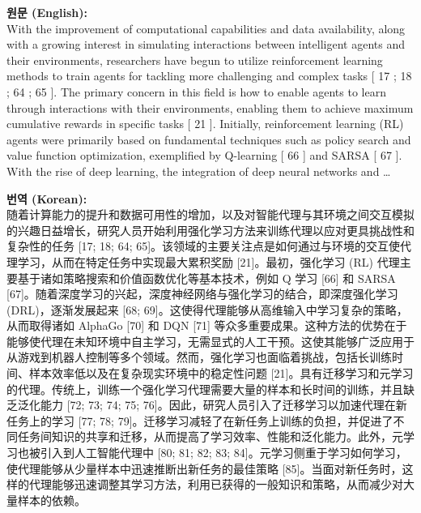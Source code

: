 \documentclass[12pt,a4paper]{article}
\begin{document}
\begin{mdframed}[style=orig]
\noindent\textbf{\small 원문 (English):}\\[2pt]
\small With the improvement of computational capabilities and data availability, along with a growing interest in simulating interactions between intelligent agents and their environments, researchers have begun to utilize reinforcement learning methods to train agents for tackling more challenging and complex tasks [ 17 ; 18 ; 64 ; 65 ]. The primary concern in this field is how to enable agents to learn through interactions with their environments, enabling them to achieve maximum cumulative rewards in specific tasks [ 21 ]. Initially, reinforcement learning (RL) agents were primarily based on fundamental techniques such as policy search and value function optimization, exemplified by Q-learning [ 66 ] and SARSA [ 67 ]. With the rise of deep learning, the integration of deep neural networks and  \ldots
\end{mdframed}
\vspace{0.4em}

\begin{mdframed}[style=ko]
\noindent\textbf{\small 번역 (Korean):}\\[2pt]
随着计算能力的提升和数据可用性的增加，以及对智能代理与其环境之间交互模拟的兴趣日益增长，研究人员开始利用强化学习方法来训练代理以应对更具挑战性和复杂性的任务 [17; 18; 64; 65]。该领域的主要关注点是如何通过与环境的交互使代理学习，从而在特定任务中实现最大累积奖励 [21]。最初，强化学习 (RL) 代理主要基于诸如策略搜索和价值函数优化等基本技术，例如 Q 学习 [66] 和 SARSA [67]。随着深度学习的兴起，深度神经网络与强化学习的结合，即深度强化学习 (DRL)，逐渐发展起来 [68; 69]。这使得代理能够从高维输入中学习复杂的策略，从而取得诸如 AlphaGo [70] 和 DQN [71] 等众多重要成果。这种方法的优势在于能够使代理在未知环境中自主学习，无需显式的人工干预。这使其能够广泛应用于从游戏到机器人控制等多个领域。然而，强化学习也面临着挑战，包括长训练时间、样本效率低以及在复杂现实环境中的稳定性问题 [21]。具有迁移学习和元学习的代理。传统上，训练一个强化学习代理需要大量的样本和长时间的训练，并且缺乏泛化能力 [72; 73; 74; 75; 76]。因此，研究人员引入了迁移学习以加速代理在新任务上的学习 [77; 78; 79]。迁移学习减轻了在新任务上训练的负担，并促进了不同任务间知识的共享和迁移，从而提高了学习效率、性能和泛化能力。此外，元学习也被引入到人工智能代理中 [80; 81; 82; 83; 84]。元学习侧重于学习如何学习，使代理能够从少量样本中迅速推断出新任务的最佳策略 [85]。当面对新任务时，这样的代理能够迅速调整其学习方法，利用已获得的一般知识和策略，从而减少对大量样本的依赖。
\end{mdframed}
\vspace{1em}
\end{document}
